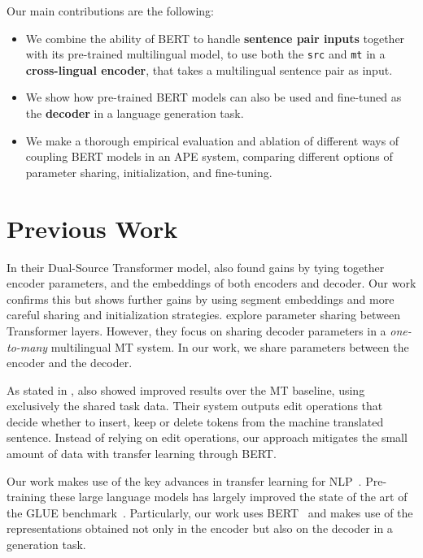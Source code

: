 Our main contributions are the following:
\begin{itemize}
    \item We combine the ability of BERT to
          handle {\bf sentence pair inputs} together with its pre-trained
          multilingual model, to use both the {\tt src} and {\tt mt} in a
              {\bf cross-lingual encoder}, that takes a multilingual
          sentence pair as input.
    \item We show how pre-trained BERT models can also be used and
          fine-tuned as the {\bf decoder} in a language generation task.
    \item We make a thorough empirical evaluation and ablation of different ways of
          coupling BERT models in an APE system, comparing different options
          of parameter sharing, initialization, and fine-tuning.
\end{itemize}

\section{Previous Work}

In their Dual-Source Transformer model, \citet{junczys2018ms} also
found gains by tying together encoder parameters, and the embeddings
of both encoders and decoder. Our work confirms this but shows
further gains by using segment embeddings and more careful sharing
and initialization strategies. \citet{sachan2018parameter} explore
parameter sharing between Transformer layers. However, they focus on
sharing decoder parameters in a \emph{one-to-many} multilingual MT
system. In our work, we share parameters between the encoder and the
decoder.

As stated in , \citet{berard2017lig} also
showed improved results over the MT baseline, using exclusively the
shared task data. Their system outputs edit operations that decide
whether to insert, keep or delete tokens from the machine translated
sentence. Instead of relying on edit operations, our approach
mitigates the small amount of data with transfer learning through
BERT.

Our work makes use of the key advances in transfer learning for
NLP~\citep{peters2018deep, howard2018universal, radford2018improving,
    devlin2018bert}. Pre-training these large language models has largely
improved the state of the art of the GLUE
benchmark~\citep{wang2018glue}. Particularly, our work uses
BERT~\citep{devlin2018bert} and makes use of the representations
obtained not only in the encoder but also on the decoder in a
generation task.

